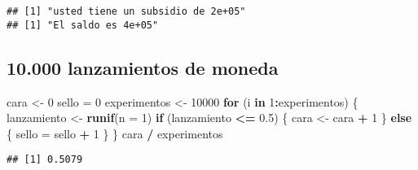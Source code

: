 \documentclass[
]{article}
\newenvironment{Shaded}{\begin{snugshade}}{\end{snugshade}}
\newcommand{\AttributeTok}[1]{\textcolor[rgb]{0.13,0.29,0.53}{#1}}
\newcommand{\ControlFlowTok}[1]{\textcolor[rgb]{0.13,0.29,0.53}{\textbf{#1}}}
\newcommand{\DecValTok}[1]{\textcolor[rgb]{0.00,0.00,0.81}{#1}}
\newcommand{\FloatTok}[1]{\textcolor[rgb]{0.00,0.00,0.81}{#1}}
\newcommand{\FunctionTok}[1]{\textcolor[rgb]{0.13,0.29,0.53}{\textbf{#1}}}
\newcommand{\NormalTok}[1]{#1}
\newcommand{\OtherTok}[1]{\textcolor[rgb]{0.56,0.35,0.01}{#1}}
\newcommand{\SpecialCharTok}[1]{\textcolor[rgb]{0.81,0.36,0.00}{\textbf{#1}}}
\begin{document}
\begin{verbatim}
## [1] "usted tiene un subsidio de 2e+05"
## [1] "El saldo es 4e+05"
\end{verbatim}

\hypertarget{lanzamientos-de-moneda}{%
\subsection{10.000 lanzamientos de
moneda}\label{lanzamientos-de-moneda}}

\begin{Shaded}
\begin{Highlighting}[]
\NormalTok{cara }\OtherTok{\textless{}{-}} \DecValTok{0}
\NormalTok{sello }\OtherTok{=} \DecValTok{0}
\NormalTok{experimentos }\OtherTok{\textless{}{-}} \DecValTok{10000} 
\ControlFlowTok{for}\NormalTok{ (i }\ControlFlowTok{in} \DecValTok{1}\SpecialCharTok{:}\NormalTok{experimentos) \{}
\NormalTok{  lanzamiento }\OtherTok{\textless{}{-}} \FunctionTok{runif}\NormalTok{(}\AttributeTok{n =} \DecValTok{1}\NormalTok{)}
  \ControlFlowTok{if}\NormalTok{ (lanzamiento }\SpecialCharTok{\textless{}=} \FloatTok{0.5}\NormalTok{) \{}
\NormalTok{    cara }\OtherTok{\textless{}{-}}\NormalTok{ cara }\SpecialCharTok{+} \DecValTok{1}
\NormalTok{  \} }\ControlFlowTok{else}\NormalTok{ \{}
\NormalTok{    sello }\OtherTok{=}\NormalTok{ sello }\SpecialCharTok{+} \DecValTok{1}
\NormalTok{  \}}
\NormalTok{\}}
\NormalTok{cara }\SpecialCharTok{/}\NormalTok{ experimentos}
\end{Highlighting}
\end{Shaded}

\begin{verbatim}
## [1] 0.5079
\end{verbatim}
\end{document}
